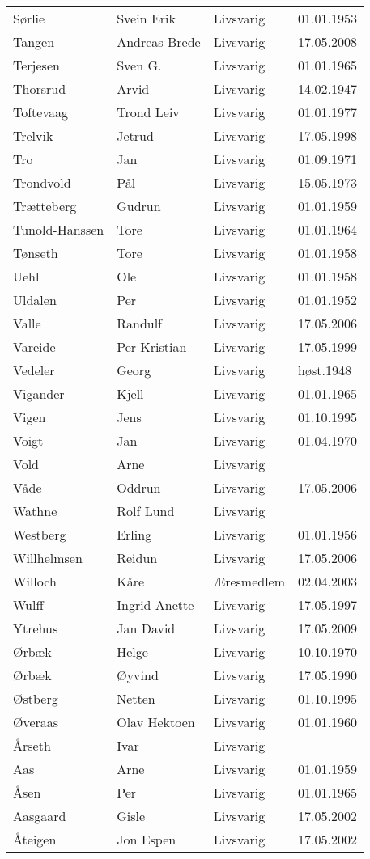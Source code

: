 \begin{longtable}{llll}
Sørlie	&	Svein Erik	&	Livsvarig 	&	01.01.1953	\\
Tangen	&	Andreas Brede	&	Livsvarig	&	17.05.2008	\\
Terjesen	&	Sven G.	&	Livsvarig 	&	01.01.1965	\\
Thorsrud	&	Arvid	&	Livsvarig 	&	14.02.1947	\\
Toftevaag	&	Trond Leiv	&	Livsvarig 	&	01.01.1977	\\
Trelvik 	&	Jetrud	&	Livsvarig	&	17.05.1998	\\
Tro	&	Jan	&	Livsvarig 	&	01.09.1971	\\
Trondvold	&	Pål	&	Livsvarig 	&	15.05.1973	\\
Trætteberg	&	Gudrun	&	Livsvarig 	&	01.01.1959	\\
Tunold-Hanssen	&	Tore	&	Livsvarig 	&	01.01.1964	\\
Tønseth	&	Tore	&	Livsvarig 	&	01.01.1958	\\
Uehl	&	Ole	&	Livsvarig 	&	01.01.1958	\\
Uldalen	&	Per	&	Livsvarig 	&	01.01.1952	\\
Valle	&	Randulf	&	Livsvarig	&	17.05.2006	\\
Vareide 	&	Per Kristian	&	Livsvarig	&	17.05.1999	\\
Vedeler	&	Georg	&	Livsvarig	&	høst.1948	\\
Vigander	&	Kjell	&	Livsvarig 	&	01.01.1965	\\
Vigen 	&	Jens	&	Livsvarig	&	01.10.1995	\\
Voigt	&	Jan	&	Livsvarig 	&	01.04.1970	\\
Vold	&	Arne	&	Livsvarig 	&		\\
Våde	&	Oddrun	&	Livsvarig	&	17.05.2006	\\
Wathne	&	Rolf Lund	&	Livsvarig 	&		\\
Westberg	&	Erling	&	Livsvarig 	&	01.01.1956	\\
Willhelmsen	&	Reidun	&	Livsvarig	&	17.05.2006	\\
Willoch	&	Kåre	&	Æresmedlem	&	02.04.2003	\\
Wulff 	&	Ingrid Anette	&	Livsvarig	&	17.05.1997	\\
Ytrehus	&	Jan David	&	Livsvarig	&	17.05.2009	\\
Ørbæk	&	Helge	&	Livsvarig 	&	10.10.1970	\\
Ørbæk	&	Øyvind	&	Livsvarig 	&	17.05.1990	\\
Østberg 	&	Netten	&	Livsvarig	&	01.10.1995	\\
Øveraas	&	Olav Hektoen	&	Livsvarig 	&	01.01.1960	\\
Årseth	&	Ivar	&	Livsvarig 	&		\\
Aas	&	Arne	&	Livsvarig 	&	01.01.1959	\\
Åsen	&	Per	&	Livsvarig 	&	01.01.1965	\\
Aasgaard 	&	Gisle	&	Livsvarig	&	17.05.2002	\\
Åteigen 	&	Jon Espen	&	Livsvarig	&	17.05.2002	\\
    \end{longtable}

